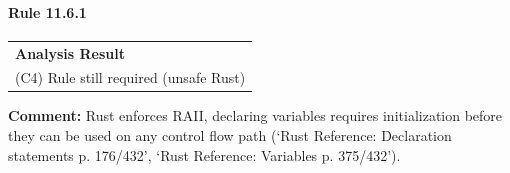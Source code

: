 \paragraph{Rule 11.6.1}
\begin{longtable}{p{13cm}}
\textbf{Analysis Result} \\
(C4) Rule still required (unsafe Rust) \\
\end{longtable}
\textbf{Comment:} Rust enforces RAII, declaring variables requires initialization before they can be used on any control flow path (`Rust Reference: Declaration statements p. 176/432', `Rust Reference: Variables p. 375/432'). \\


